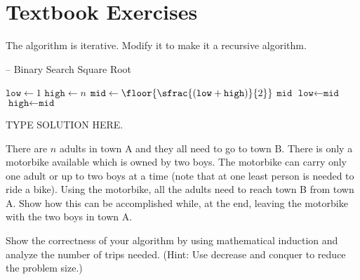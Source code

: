 \documentclass[final]{article}
\begin{document}
\section{Textbook Exercises}
\begin{exercise}{2.3}
    The algorithm  is iterative. Modify it to make it a recursive algorithm.

    \begin{algorithm}[H]
        \caption[]{ -- Binary Search Square Root}
        \label{alg:binsqrt}
        \begin{algorithmic}[1]
            \State $\texttt{low} \gets 1$   
            \State $\texttt{high} \gets n$  
            \While{\True}
            \State $\texttt{mid} \gets \floor{\sfrac{(\texttt{low} + \texttt{high})}{2}}$   
            \State \Return $\texttt{mid}$
             
            \State $\texttt{low} \gets \texttt{mid}$
            \Else {}
            \State $\texttt{high} \gets \texttt{mid}$
            \EndIf
            \EndWhile
            \EndFunction
        \end{algorithmic}
    \end{algorithm}
\end{exercise}

\begin{solution}
    TYPE SOLUTION HERE.
\end{solution}

\begin{exercise}{2.9}
    There are $n$ adults in town A and they all need to go to town B. There is only a motorbike available which is owned by two boys.
    The motorbike can carry only one adult or up to two boys at a time (note that at one least person is needed to ride a bike). Using the motorbike, all the adults need to reach town B from town A.
    Show how this can be accomplished while, at the end, leaving the motorbike with the two boys in town A.

    Show the correctness of your algorithm by using mathematical induction and analyze the number of trips needed. (Hint: Use decrease and conquer to reduce the problem size.)
\end{exercise}
\end{document}
